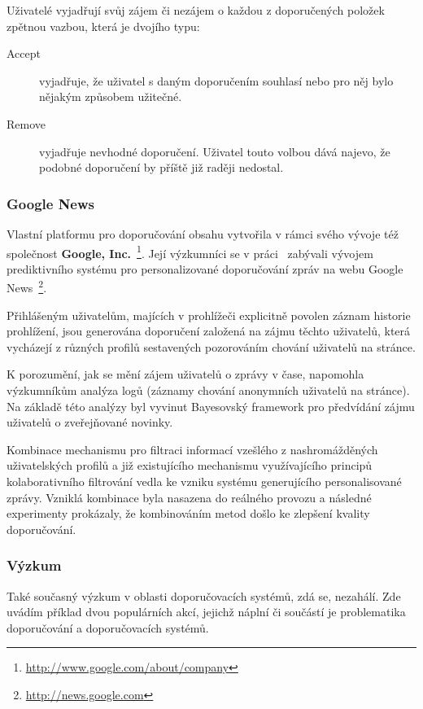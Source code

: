 \documentclass[thesis=M,czech]{FITthesis}[2014/05/07]
\begin{document}
Uživatelé vyjadřují svůj zájem či nezájem o každou z doporučených položek zpětnou vazbou, která je dvojího typu:

\begin{description}
	\item[Accept] vyjadřuje, že uživatel s daným doporučením souhlasí nebo pro něj bylo nějakým způsobem užitečné.
	\item[Remove] vyjadřuje nevhodné doporučení. Uživatel touto volbou dává najevo, že podobné doporučení by příště již raději nedostal.
\end{description}

\subsubsection{Google News}	

Vlastní platformu pro doporučování obsahu vytvořila v rámci svého vývoje též společnost \textbf{Google, Inc.}~\footnote{\url{http://www.google.com/about/company}}. Její výzkumníci se v práci~\cite{googlenews} zabývali vývojem prediktivního systému pro personalizované doporučování zpráv na webu Google News~\footnote{\url{http://news.google.com}}.

Přihlášeným uživatelům, majících v prohlížeči explicitně povolen záznam historie prohlížení, jsou generována doporučení založená na zájmu těchto uživatelů, která vycházejí z různých profilů sestavených pozorováním chování uživatelů na stránce.  

K porozumění, jak se mění zájem uživatelů o zprávy v čase, napomohla výzkumníkům analýza logů (záznamy chování anonymních uživatelů na stránce). Na základě této analýzy byl vyvinut Bayesovský framework pro předvídání zájmu uživatelů o zveřejňované novinky.

Kombinace mechanismu pro filtraci informací vzešlého z nashromážděných uživatelských profilů a již existujícího mechanismu využívajícího principů kolaborativního filtrování vedla ke vzniku systému generujícího personalisované zprávy. Vzniklá kombinace byla nasazena do reálného provozu a následné experimenty prokázaly, že kombinováním metod došlo ke zlepšení kvality doporučování.

\subsubsection{Výzkum}

Také současný výzkum v oblasti doporučovacích systémů, zdá se, nezahálí. Zde uvádím příklad dvou populárních akcí, jejichž náplní či součástí je problematika doporučování a doporučovacích systémů.
\end{document}
